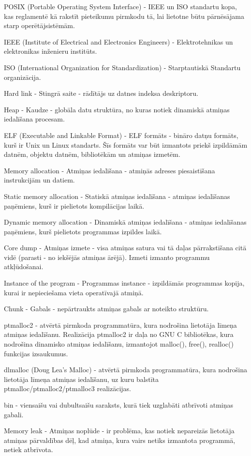 \noindent 

POSIX (Portable Operating System Interface) - IEEE un ISO standartu kopa,  kas reglamentē kā rakstīt pieteikumu pirmkodu tā, lai lietotne būtu pārnēsājama starp operētājsistēmām.

IEEE (Institute of Electrical and Electronics Engineers) - Elektrotehnikas un elektronikas inženieru institūts.

ISO (International Organization for Standardization) - Starptautiskā Standartu organizācija.

Hard link - Stingrā saite - rādītājs uz datnes indeksa deskriptoru. 

Heap - Kaudze - globāla datu struktūra,  no kuras notiek dinamiskā atmiņas iedalīšana procesam.

ELF (Executable and Linkable Format) - ELF formāts -  bināro datņu formāts, kurš ir Unix un Linux standarts. Šīs formāts var būt izmantots priekš izpildāmām datnēm, objektu datnēm, bibliotēkām un atmiņas izmetēm.

Memory allocation - Atmiņas iedalīšana - atmiņās adreses piesaistīšana instrukcijām un datiem.

Static memory allocation - Statiskā atmiņas iedalīšana -  atmiņas iedalīšanas paņēmiens, kurš ir pielietots kompilācijas laikā.

Dynamic memory allocation - Dinamiskā atmiņas iedalīšana - atmiņas iedalīšanas paņēmiens, kurš pielietots programmas izpildes laikā. 

Core dump - Atmiņas izmete - visa atmiņas satura vai tā daļas pārrakstīšana citā vidē (parasti - no iekšējās atmiņas ārējā). 
Izmeti izmanto programmu atkļūdošanai.

Instance of the program - Programmas instance - izpildāmās programmas kopija, kurai ir nepieciešama vieta operatīvajā atmiņā.

Chunk - Gabals - nepārtraukts atmiņas gabals ar noteikto struktūru.

ptmalloc2 - atvērtā pirmkoda programmatūra, kura nodrošina lietotāja līmeņa atmiņas iedalīšanu. Realizācija ptmalloc2 ir daļa no GNU C bibliotēkas, kura nodrošina dinamisko atmiņas iedalīšanu, izmantojot malloc(), free(), realloc() funkcijas izsaukumus.

dlmalloc (Doug Lea's Malloc) - atvērtā pirmkoda programmatūra, kura nodrošina lietotāja līmeņa atmiņas iedalīšanu, uz kuru balstīta ptmalloc/ptmalloc2/ptmalloc3 realizācijas.

bin - viensaišu vai dubultsaišu saraksts, kurā tiek uzglabāti atbrīvoti atmiņas gabali.

Memory leak - Atmiņas noplūde - ir problēma, kas notiek nepareizās lietotāja atmiņas pārvaldības dēļ, kad atmiņa, kura vairs netiks izmantota programmā, netiek atbrīvota.

